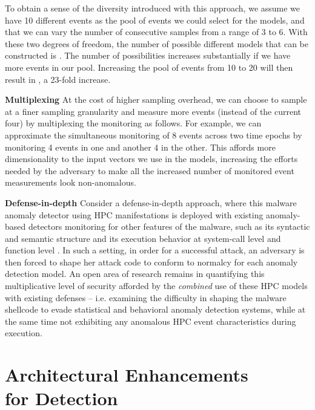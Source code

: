 \documentclass{acm_proc_article-sp}
\begin{document}
To obtain a sense of the diversity introduced with this approach, we assume we have 10 different events as the pool of events we could select for the models, and that we can vary the number of consecutive samples from a range of 3 to 6. With these two degrees of freedom, the number of possible different models that can be constructed is . The number of possibilities increases substantially if we have more events in our pool. Increasing the pool of events from 10 to 20 will then result in , a 23-fold increase.

\textbf{Multiplexing} \space\space At the cost of higher sampling overhead, we can choose to sample at a finer sampling granularity and measure more events (instead of the current four) by multiplexing the monitoring as follows. For example, we can approximate the simultaneous monitoring of 8 events across two time epochs by monitoring 4 events in one and another 4 in the other. This affords more dimensionality to the input vectors we use in the models, increasing the efforts needed by the adversary to make all the increased number of monitored event measurements look non-anomalous.

\textbf{Defense-in-depth} \space\space Consider a defense-in-depth approach, where this malware anomaly detector using HPC manifestations is deployed with existing anomaly-based detectors monitoring for other features of the malware, such as its syntactic and semantic structure \cite{krugel2002service, wang2006anagram, kong2012sa3, mahoney2003network} and its execution behavior at system-call level \cite{hofmeyr1998intrusion, somayaji2000automated, forrest1996sense, marceau2001characterizing, sekar2001fast} and function level \cite{peisert2007analysis}. In such a setting, in order for a successful attack, an adversary is then forced to shape her attack code to conform to normalcy for each anomaly detection model. An open area of research remains in quantifying this multiplicative level of security afforded by the \textit{combined} use of these HPC models with existing defenses -- i.e. examining the difficulty in shaping the malware shellcode to evade statistical and behavioral anomaly detection systems, while at the same time not exhibiting any anomalous HPC event characteristics during execution.



\section{Architectural Enhancements \\for Detection}
\label{sec:arch}
\end{document}
